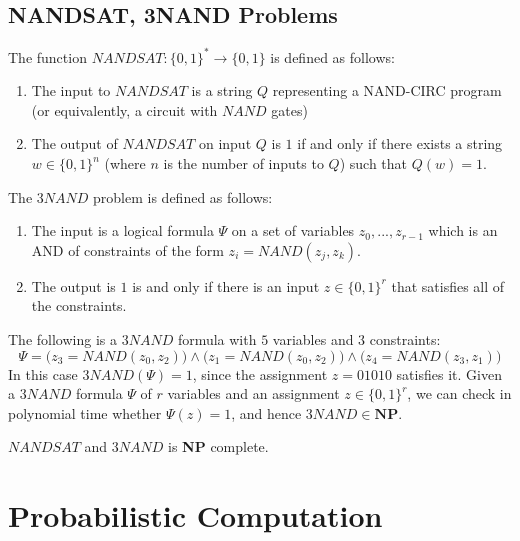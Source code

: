 \documentclass{article}
\begin{document}
  \subsection{NANDSAT, 3NAND Problems}
  \begin{definition}
  The function $NANDSAT: \{0,1\}^* \longrightarrow \{0,1\}$ is defined as follows: 
  \begin{enumerate}
      \item The input to $NANDSAT$ is a string $Q$ representing a NAND-CIRC program (or equivalently, a circuit with $NAND$ gates)
      \item The output of $NANDSAT$ on input $Q$ is $1$ if and only if there exists a string $w \in \{0,1\}^n$ (where $n$ is the number of inputs to $Q$) such that $Q(w) = 1$. 
  \end{enumerate}
  \end{definition}

  \begin{definition}
  The $3NAND$ problem is defined as follows: 
  \begin{enumerate}
      \item The input is a logical formula $\Psi$ on a set of variables $z_0, ..., z_{r-1}$ which is an AND of constraints of the form $z_i = NAND(z_j, z_k)$. 
      \item The output is $1$ is and only if there is an input $z \in \{0, 1\}^r$ that satisfies all of the constraints. 
  \end{enumerate}
  \end{definition}

  \begin{example}
  The following is a $3NAND$ formula with $5$ variables and $3$ constraints:
  \[\Psi = \big( z_3 = NAND(z_0, z_2)\big) \wedge \big( z_1 = NAND(z_0, z_2)\big) \wedge \big( z_4 = NAND(z_3, z_1)\big)\]
  In this case $3NAND(\Psi) = 1$, since the assignment $z = 01010$ satisfies it. Given a $3NAND$ formula $\Psi$ of $r$ variables and an assignment $z \in \{0,1\}^r$, we can check in polynomial time whether $\Psi (z) = 1$, and hence $3NAND \in \mathbf{NP}$. 
  \end{example}

  \begin{theorem}
  $NANDSAT$ and $3NAND$ is \textbf{NP} complete. 
  \end{theorem}

\section{Probabilistic Computation}
\end{document}

